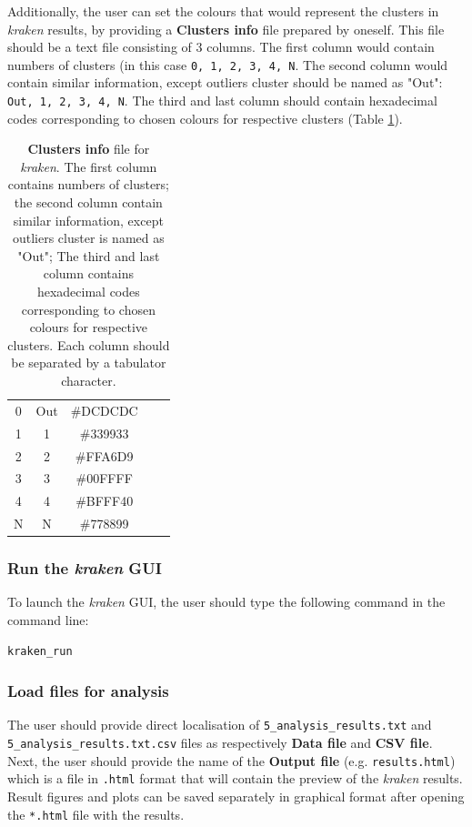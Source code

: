 \documentclass[9pt,tutorial]{livecoms}
\begin{document}
Additionally, the user can set the colours that would represent the clusters in \textit{kraken} results, by providing a \textbf{Clusters info} file prepared by oneself. This file should be a text file consisting of 3 columns. The first column would contain numbers of clusters (in this case \texttt{0, 1, 2, 3, 4, N}. The second column would contain similar information, except outliers cluster should be named as "Out": \texttt{Out, 1, 2, 3, 4, N}. The third and last column should contain hexadecimal codes corresponding to chosen colours for respective clusters ({Table \ref{table1}}).

\begin{table}[hbt!]
\centering
\begin{tabular}{ c c c c c }
 0 & Out & \#DCDCDC \\ 
 1 & 1 & \#339933 \\  
 2 & 2 & \#FFA6D9 \\
 3 & 3 & \#00FFFF \\
 4 & 4 & \#BFFF40 \\
 N & N & \#778899
 \end{tabular}
 \caption{\textbf{Clusters info} file for \textit{kraken}. The first column contains numbers of clusters; the second column contain similar information, except outliers cluster is named as "Out"; The third and last column contains hexadecimal codes corresponding to chosen colours for respective clusters. Each column should be separated by a tabulator character.}
\label{table1}
\end{table}

\subsubsection{Run the \emph{kraken} GUI}
To launch the \textit{kraken} GUI, the user should type the following command in the command line:
\begin{lstlisting}
kraken_run 
\end{lstlisting}

\subsubsection{Load files for analysis}
The user should provide direct localisation of \newline \texttt{5\_analysis\_results.txt} and \texttt{5\_analysis\_results.txt.csv} files as respectively \textbf{Data file} and \textbf{CSV file}. Next, the user should provide the name of the \textbf{Output file} (e.g. \texttt{results.html}) which is a  file in \texttt{.html} format that will contain the preview of the \textit{kraken} results. Result figures and plots can be saved separately in graphical format after opening the \texttt{*.html} file with the results. 
\end{document}
